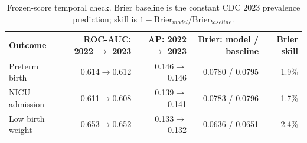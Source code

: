 \begin{table}[!htbp]
\centering
\caption{Frozen-score temporal check. Brier baseline is the constant CDC 2023 prevalence prediction; skill is $1-\mathrm{Brier}_{model}/\mathrm{Brier}_{baseline}$.}
\label{tab:score_transport}
\small
\setlength{\tabcolsep}{4.0pt}
\begin{tabular*}{\linewidth}{@{\extracolsep{\fill}}lrrrr@{}}
\toprule
Outcome & ROC-AUC: 2022 $\rightarrow$ 2023 & AP: 2022 $\rightarrow$ 2023 & Brier: model / baseline & Brier skill \\
\midrule
Preterm birth & 0.614$\rightarrow$0.612 & 0.146$\rightarrow$0.146 & 0.0780 / 0.0795 & 1.9\% \\
NICU admission & 0.611$\rightarrow$0.608 & 0.139$\rightarrow$0.141 & 0.0783 / 0.0796 & 1.7\% \\
Low birth weight & 0.653$\rightarrow$0.652 & 0.133$\rightarrow$0.132 & 0.0636 / 0.0651 & 2.4\% \\
\bottomrule
\end{tabular*}
\end{table}
